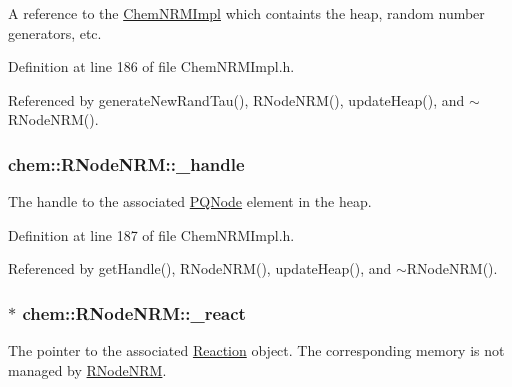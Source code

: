 A reference to the \hyperlink{classchem_1_1ChemNRMImpl}{Chem\-N\-R\-M\-Impl} which containts the heap, random number generators, etc. 



Definition at line 186 of file Chem\-N\-R\-M\-Impl.\-h.



Referenced by generate\-New\-Rand\-Tau(), R\-Node\-N\-R\-M(), update\-Heap(), and $\sim$\-R\-Node\-N\-R\-M().

\hypertarget{classchem_1_1RNodeNRM_ad124c85b0f1b479cf0c1f4bf75230c19}{
\subsubsection[{\-\_\-handle}]{ {\bf chem\-::\-R\-Node\-N\-R\-M\-::\-\_\-handle}}}\label{classchem_1_1RNodeNRM_ad124c85b0f1b479cf0c1f4bf75230c19}


The handle to the associated \hyperlink{classchem_1_1PQNode}{P\-Q\-Node} element in the heap. 



Definition at line 187 of file Chem\-N\-R\-M\-Impl.\-h.



Referenced by get\-Handle(), R\-Node\-N\-R\-M(), update\-Heap(), and $\sim$\-R\-Node\-N\-R\-M().

\hypertarget{classchem_1_1RNodeNRM_add823fa4b223afe0d750ed731c827d07}{
\subsubsection[{\-\_\-react}]{$\ast$ {\bf chem\-::\-R\-Node\-N\-R\-M\-::\-\_\-react}}}\label{classchem_1_1RNodeNRM_add823fa4b223afe0d750ed731c827d07}


The pointer to the associated \hyperlink{classchem_1_1Reaction}{Reaction} object. The corresponding memory is not managed by \hyperlink{classchem_1_1RNodeNRM}{R\-Node\-N\-R\-M}. 



